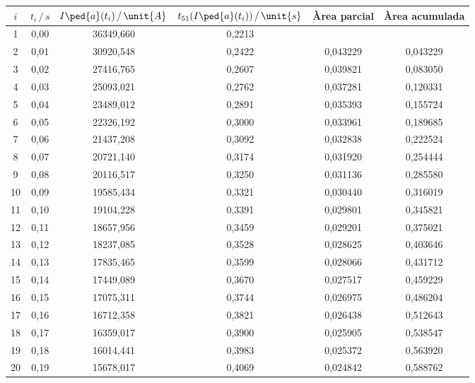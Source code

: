 \begin{exemple}
	
	\begin{center}
		\centering
		\begin{tabular}{S[table-format=2.0]S[table-format=1.2]
				S[table-format=5.3]S[table-format=1.4]
				S[table-format=1.6]S[table-format=1.6]}
			  &  {$t_i\,/\,\unit{s}$}  &  {$I\ped{a}(t_i)\,/\,\unit{A}$}  & {$t_{51}(I\ped{a}(t_i))\,/\,\unit{s}$}  & {Àrea parcial}  & {Àrea acumulada} \\
			  &  0,00  &  36349,660  &  0,2213  &  {}        &  {}       \\
			2  &  0,01  &  30920,548  &  0,2422  &  0,043229  &  0,043229 \\
			3  &  0,02  &  27416,765  &  0,2607  &  0,039821  &  0,083050 \\
			4  &  0,03  &  25093,021  &  0,2762  &  0,037281  &  0,120331 \\
			5  &  0,04  &  23489,012  &  0,2891  &  0,035393  &  0,155724 \\
			6  &  0,05  &  22326,192  &  0,3000  &  0,033961  &  0,189685 \\
			7  &  0,06  &  21437,208  &  0,3092  &  0,032838  &  0,222524 \\
			8  &  0,07  &  20721,140  &  0,3174  &  0,031920  &  0,254444 \\
			9  &  0,08  &  20116,517  &  0,3250  &  0,031136  &  0,285580 \\
			10  &  0,09  &  19585,434  &  0,3321  &  0,030440  &  0,316019 \\
			11  &  0,10  &  19104,228  &  0,3391  &  0,029801  &  0,345821 \\
			12  &  0,11  &  18657,956  &  0,3459  &  0,029201  &  0,375021 \\
			13  &  0,12  &  18237,085  &  0,3528  &  0,028625  &  0,403646 \\
			14  &  0,13  &  17835,465  &  0,3599  &  0,028066  &  0,431712 \\
			15  &  0,14  &  17449,089  &  0,3670  &  0,027517  &  0,459229 \\
			16  &  0,15  &  17075,311  &  0,3744  &  0,026975  &  0,486204 \\
			17  &  0,16  &  16712,358  &  0,3821  &  0,026438  &  0,512643 \\
			18  &  0,17  &  16359,017  &  0,3900  &  0,025905  &  0,538547 \\
			19  &  0,18  &  16014,441  &  0,3983  &  0,025372  &  0,563920 \\
			20  &  0,19  &  15678,017  &  0,4069  &  0,024842  &  0,588762 \\

\end{tabular}
\end{center}
\end{exemple}
